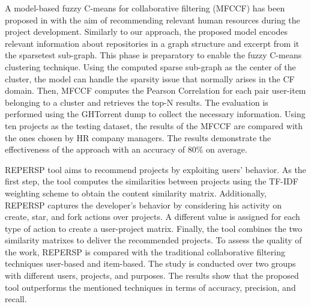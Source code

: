 A model-based fuzzy C-means for collaborative filtering (MFCCF) has been proposed in \cite{ajoudanian_recommending_2019} with the aim of recommending relevant human resources during the \GH project development. Similarly to our approach, the proposed model encodes relevant information about repositories in a graph structure and excerpt from it the sparsetest sub-graph. This phase is preparatory to enable the fuzzy C-means clustering technique. Using the computed sparse sub-graph as the center of the cluster, the model can handle the sparsity issue that normally arises in the CF domain. Then, MFCCF computes the Pearson Correlation for each pair user-item belonging to a cluster and retrieves the top-N results. The evaluation is performed using the GHTorrent dump to collect the necessary information. Using ten projects as the testing dataset, the results of the MFCCF are compared with the ones chosen by HR company managers. The results demonstrate the effectiveness of the approach with an accuracy of 80\% on average. 

REPERSP tool \cite{xu_repersp_2017} aims to recommend \GH projects by exploiting users' behavior. As the first step, the tool computes the similarities between projects using the TF-IDF weighting scheme to obtain the content similarity matrix. Additionally, REPERSP captures the developer's behavior by considering his activity on \GH \ie create, star, and fork actions over projects. A different value is assigned for each type of action to create a user-project matrix. Finally, the tool combines the two similarity matrixes to deliver the recommended projects. To assess the quality of the work, REPERSP is compared with the traditional collaborative filtering techniques \ie user-based and item-based. The study is conducted over two groups with different users, projects, and purposes. The results show that the proposed tool outperforms the mentioned techniques in terms of accuracy, precision, and recall. 